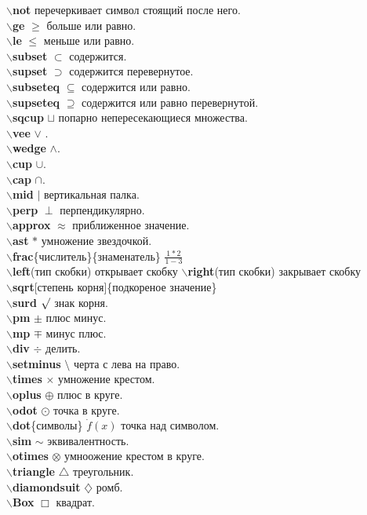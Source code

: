 \documentclass{article}
\newcommand{\bs}{$\backslash$}
\newcommand{\bd}[1]{{\bfseries #1}} %
\newcommand{\bb}[1]{\bd{\bs #1}} %
\begin{document}
\bb{not} перечеркивает символ стоящий после него.\\
\bb{ge} $\ge$ больше или равно.\\
\bb{le} $\le$ меньше или равно.\\
\bb{subset} $\subset$ содержится.\\
\bb{supset} $\supset$ содержится перевернутое.\\
\bb{subseteq} $\subseteq$ содержится или равно.\\
\bb{supseteq} $\supseteq$ содержится или равно перевернутой.\\
\bb{sqcup} $\sqcup$ попарно непересекающиеся множества.\\
\bb{vee} $\vee$ .\\
\bb{wedge} $\wedge$.\\
\bb{cup} $\cup$.\\
\bb{cap} $\cap$.\\
\bb{mid} $\mid$ вертикальная палка.\\
\bb{perp} $\perp$ перпендикулярно.\\
\bb{approx} $\approx$ приближенное значение.\\
\bb{ast} $\ast$ умножение звездочкой.\\
\bb{frac}\{числитель\}\{знаменатель\} $\frac{1*2}{1-3}$\\
\bb{left}(тип скобки) открывает скобку \bb{right}(тип скобки) закрывает скобку\\
\bb{sqrt}[степень корня]\{подкореное значение\}\\
\bb{surd} $\surd$ знак корня.\\
\bb{pm} $\pm$ плюс минус.\\
\bb{mp} $\mp$ минус плюс.\\
\bb{div} $\div$ делить.\\
\bb{setminus} $\setminus$ черта с лева на право.\\
\bb{times} $\times$ умножение крестом.\\
\bb{oplus} $\oplus$ плюс в круге.\\
\bb{odot} $\odot$ точка в круге.\\
\bb{dot}\{символы\} $\dot{f}(x)$ точка над символом.\\
\bb{sim} $\sim$ эквивалентность.\\
\bb{otimes} $\otimes$ умноожение крестом в круге.\\
\bb{triangle} $\triangle$ треугольник.\\
\bb{diamondsuit} $\diamondsuit$ ромб.\\
\bb{Box} $\Box$ квадрат.\\
\end{document}
